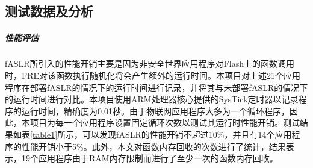 \documentclass[12pt,a4paper]{ctexart}
\numberwithin{figure}{section}
\begin{document}
\subsection{测试数据及分析}
\subparagraph{性能评估}
\par fASLR所引入的性能开销主要是因为非安全世界应用程序对Flash上的函数调用时，FRE对该函数执行随机化将会产生额外的运行时间。本项目对上述21个应用程序在部署fASLR的情况下的运行时间进行记录，并将其与未部署fASLR的情况下的运行时间进行对比。本项目使用ARM处理器核心提供的SysTick定时器以记录程序的运行时间，精确度为0.01秒。由于物联网应用程序大多为一个循环程序，因此，本项目为每一个应用程序设置固定循环次数以测试其运行时性能开销。测试结果如表\ref{table1}所示，可以发现fASLR的性能开销不超过10\%，并且有14个应用程序的性能开销小于5\%。此外，本文对函数内存回收的次数进行了统计，结果表示，19个应用程序由于RAM内存限制而进行了至少一次的函数内存回收。
\end{document}
